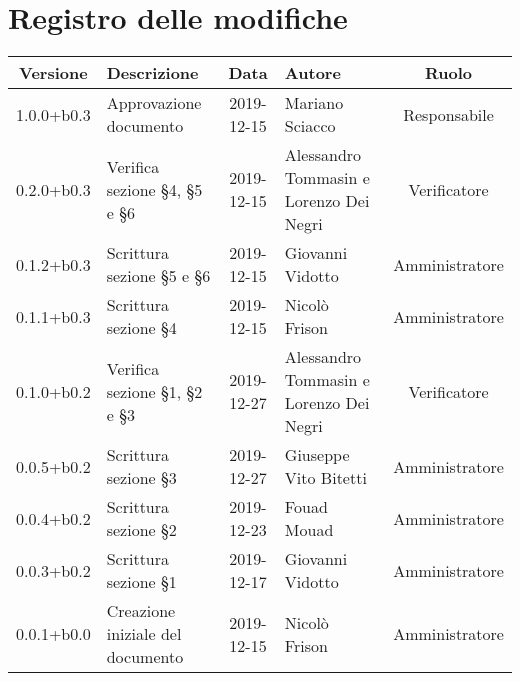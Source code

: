 \section*{Registro delle modifiche}

\begin{center}
	\begin{longtable}{|c|p{3cm}|c|p{4cm}|c|}
	\hline
	\rowcolor{lighter-grayer}
	\textbf{Versione} & \textbf{Descrizione} & \textbf{Data} & \textbf{Autore} & \textbf{Ruolo} \\
	\hline
	\endfirsthead

	1.0.0+b0.3 & Approvazione documento & 2019-12-15 & Mariano Sciacco & Responsabile \\
	\hline
	0.2.0+b0.3 & Verifica sezione \S4, \S5 e \S6 & 2019-12-15 & Alessandro Tommasin e Lorenzo Dei Negri & Verificatore \\
	\hline
	0.1.2+b0.3 & Scrittura sezione \S5 e \S6 & 2019-12-15 & Giovanni Vidotto & Amministratore \\
	\hline
	0.1.1+b0.3 &  Scrittura sezione \S4 & 2019-12-15 & Nicolò Frison & Amministratore \\
	\hline
	0.1.0+b0.2 & Verifica sezione \S1, \S2 e \S3 & 2019-12-27 & Alessandro Tommasin e Lorenzo Dei Negri & Verificatore \\
	\hline
	0.0.5+b0.2 & Scrittura sezione \S3 & 2019-12-27  & Giuseppe Vito Bitetti & Amministratore \\
	\hline
	0.0.4+b0.2 & Scrittura sezione \S2 & 2019-12-23 & Fouad Mouad & Amministratore \\
	\hline
	0.0.3+b0.2 & Scrittura sezione \S1 & 2019-12-17 & Giovanni Vidotto & Amministratore \\
	\hline
	0.0.1+b0.0 & Creazione iniziale del documento & 2019-12-15 & Nicolò Frison & Amministratore \\
	\hline

	\end{longtable}
\end{center}